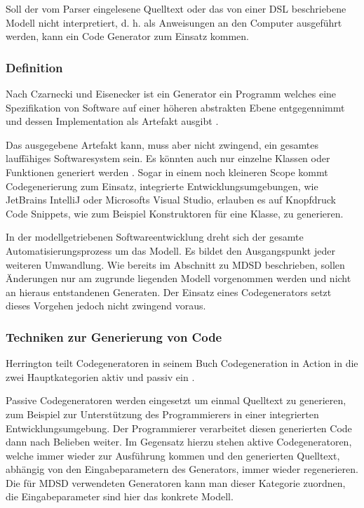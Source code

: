 \documentclass[12pt,oneside,a4paper,parskip]{scrbook}
\begin{document}
Soll der vom Parser eingelesene Quelltext oder das von einer DSL beschriebene Modell nicht interpretiert, d. h. als Anweisungen an den Computer ausgeführt werden, kann ein Code Generator zum Einsatz kommen.

\subsubsection{Definition}

Nach Czarnecki und Eisenecker ist ein Generator ein Programm welches eine Spezifikation von Software auf einer höheren abstrakten Ebene entgegennimmt und dessen Implementation als Artefakt ausgibt \cite[S. 333]{czaeis2000}.

Das ausgegebene Artefakt kann, muss aber nicht zwingend, ein gesamtes lauffähiges Softwaresystem sein. Es könnten auch nur einzelne Klassen oder Funktionen generiert werden \cite[S. 333]{czaeis2000}. Sogar in einem noch kleineren Scope kommt Codegenerierung zum Einsatz, integrierte Entwicklungsumgebungen, wie JetBrains IntelliJ oder Microsofts Visual Studio, erlauben es auf Knopfdruck Code Snippets, wie zum Beispiel Konstruktoren für eine Klasse, zu generieren.

In der modellgetriebenen Softwareentwicklung dreht sich der gesamte Automatisierungsprozess um das Modell. Es bildet den Ausgangspunkt jeder weiteren Umwandlung. Wie bereits im Abschnitt zu MDSD beschrieben, sollen Änderungen nur am zugrunde liegenden Modell vorgenommen werden und nicht an hieraus entstandenen Generaten. Der Einsatz eines Codegenerators setzt dieses Vorgehen jedoch nicht zwingend voraus.

\subsubsection{Techniken zur Generierung von Code}

Herrington teilt Codegeneratoren in seinem Buch Codegeneration in Action in die zwei Hauptkategorien aktiv und passiv ein \cite[S. 28]{herrington2003}. 

Passive Codegeneratoren werden eingesetzt um einmal Quelltext zu generieren, zum Beispiel zur Unterstützung des Programmierers in einer integrierten Entwicklungsumgebung. Der Programmierer verarbeitet diesen generierten Code dann nach Belieben weiter. Im Gegensatz hierzu stehen aktive Codegeneratoren, welche immer wieder zur Ausführung kommen und den generierten Quelltext, abhängig von den Eingabeparametern des Generators, immer wieder regenerieren. Die für MDSD verwendeten Generatoren kann man dieser Kategorie zuordnen, die Eingabeparameter sind hier das konkrete Modell. 
\end{document}
